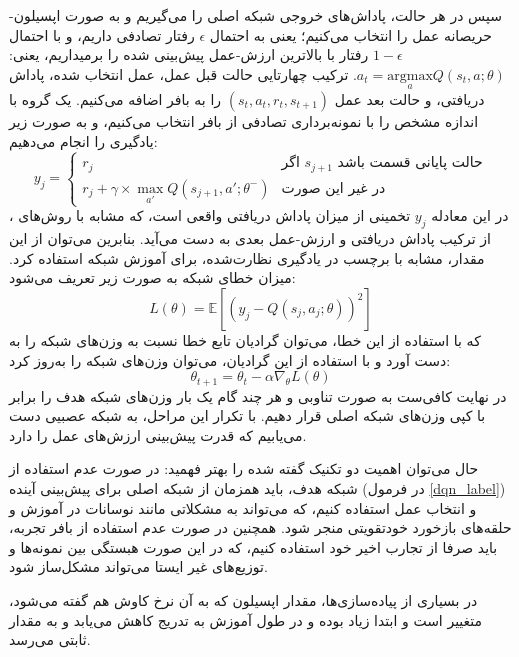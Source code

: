 سپس در هر حالت، پاداش‌های خروجی شبکه اصلی را می‌گیریم و به صورت اپسیلون-حریصانه عمل را انتخاب می‌کنیم؛
یعنی به احتمال $\epsilon$ رفتار تصادفی داریم، 
و با احتمال $1-\epsilon$
رفتار با بالاترین ارزش-عمل پیش‌بینی شده را برمیداریم، یعنی: $a_t = \underset{a}{\mathrm{argmax}} Q(s_t, a; \theta)$.
ترکیب چهارتایی حالت قبل عمل، عمل انتخاب شده، پاداش دریافتی، و حالت بعد عمل $(s_t,a_t,r_t,s_{t+1})$
را به بافر اضافه می‌کنیم.
یک گروه با اندازه مشخص را با نمونه‌برداری تصادفی از بافر انتخاب می‌کنیم، و به صورت زیر یادگیری را انجام می‌دهیم:
\begin{equation}\label{dqn_label}
    y_j = \begin{cases}
        r_j & \text{اگر $s_{j+1}$ حالت پایانی قسمت باشد} \\
        r_j + \gamma \times \max_{a'} Q(s_{j+1}, a'; \theta^-) & \text{در غیر این صورت}
    \end{cases}
\end{equation}
در این معادله $y_j$ تخمینی از میزان پاداش دریافتی واقعی است، که مشابه با روش‌های ، از ترکیب پاداش دریافتی و ارزش-عمل بعدی به دست می‌آید.
بنابرین می‌توان از این مقدار، مشابه با برچسب در یادگیری نظارت‌شده، برای آموزش شبکه استفاده کرد.
میزان خطای شبکه به صورت زیر تعریف می‌شود:
\begin{equation}\label{dqn_loss}
    L(\theta) = \mathbb{E}[(y_j - Q(s_j, a_j; \theta))^2]
\end{equation}
که با استفاده از این خطا، می‌توان گرادیان تابع خطا نسبت به وزن‌های شبکه را به دست آورد و
با استفاده از این گرادیان، می‌توان وزن‌های شبکه را به‌روز کرد:
\begin{equation}\label{dqn_update}
    \theta_{t+1} = \theta_t - \alpha \nabla_\theta L(\theta)
\end{equation}
در نهایت کافی‌ست به صورت تناوبی و هر چند گام یک بار وزن‌های شبکه هدف را برابر با کپی وزن‌های شبکه اصلی قرار دهیم. با تکرار این مراحل، به شبکه عصبیی دست می‌یابیم که قدرت پیش‌بینی ارزش‌های عمل را دارد.


حال می‌توان اهمیت دو تکنیک گفته شده را بهتر فهمید: در صورت عدم استفاده از شبکه هدف، باید همزمان از شبکه اصلی برای پیش‌بینی آینده (در فرمول \ref{dqn_label}) و انتخاب عمل استفاده کنیم، که می‌تواند به مشکلاتی مانند نوسانات در آموزش و حلقه‌های بازخورد خودتقویتی منجر شود.
همچنین در صورت عدم استفاده از بافر تجربه، باید صرفا از تجارب اخیر خود استفاده کنیم، که در این صورت هبستگی بین نمونه‌ها و توزیع‌های غیر ایستا می‌تواند مشکل‌ساز شود.

در بسیاری از پیاده‌سازی‌ها، مقدار اپسیلون که به آن نرخ کاوش هم گفته می‌شود، متغییر است و ابتدا زیاد بوده و در طول آموزش به تدریج کاهش می‌یابد و به مقدار ثابتی می‌رسد.
